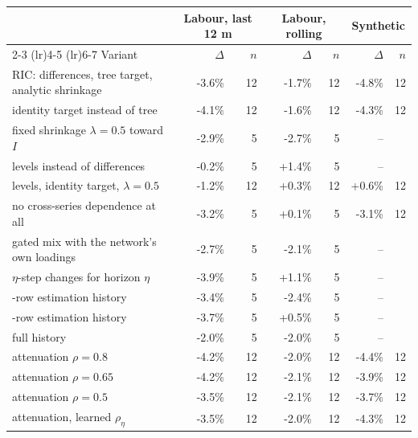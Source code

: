 \begin{tabular}{lrrrrrr}
\toprule
 & \multicolumn{2}{c}{Labour, last 12 m} & \multicolumn{2}{c}{Labour, rolling} & \multicolumn{2}{c}{Synthetic} \\
\cmidrule(lr){2-3} \cmidrule(lr){4-5} \cmidrule(lr){6-7}
Variant & $\Delta$ & $n$ & $\Delta$ & $n$ & $\Delta$ & $n$ \\
\midrule
RIC: differences, tree target, analytic shrinkage & -3.6\% & 12 & -1.7\% & 12 & -4.8\% & 12 \\
\quad identity target instead of tree & -4.1\% & 12 & -1.6\% & 12 & -4.3\% & 12 \\
\quad fixed shrinkage $\lambda{=}0.5$ toward $I$ & -2.9\% & 5 & -2.7\% & 5 & -- &  \\
\quad levels instead of differences & -0.2\% & 5 & +1.4\% & 5 & -- &  \\
\quad levels, identity target, $\lambda{=}0.5$ & -1.2\% & 12 & +0.3\% & 12 & +0.6\% & 12 \\
\quad no cross-series dependence at all & -3.2\% & 5 & +0.1\% & 5 & -3.1\% & 12 \\
\quad gated mix with the network's own loadings & -2.7\% & 5 & -2.1\% & 5 & -- &  \\
\quad $\eta$-step changes for horizon $\eta$ & -3.9\% & 5 & +1.1\% & 5 & -- &  \\
\quad 60-row estimation history & -3.4\% & 5 & -2.4\% & 5 & -- &  \\
\quad 120-row estimation history & -3.7\% & 5 & +0.5\% & 5 & -- &  \\
\quad full history & -2.0\% & 5 & -2.0\% & 5 & -- &  \\
\quad attenuation $\rho{=}0.8$ & -4.2\% & 12 & -2.0\% & 12 & -4.4\% & 12 \\
\quad attenuation $\rho{=}0.65$ & -4.2\% & 12 & -2.1\% & 12 & -3.9\% & 12 \\
\quad attenuation $\rho{=}0.5$ & -3.5\% & 12 & -2.1\% & 12 & -3.7\% & 12 \\
\quad attenuation, learned $\rho_\eta$ & -3.5\% & 12 & -2.0\% & 12 & -4.3\% & 12 \\
\bottomrule
\end{tabular}
